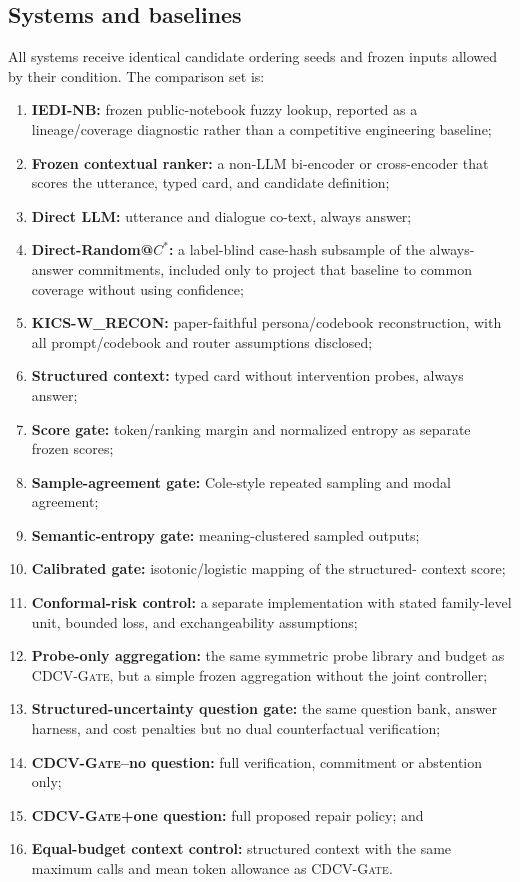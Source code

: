 \documentclass[preprint,12pt,authoryear]{elsarticle}
\newcommand{\cdcv}{\textsc{CDCV-Gate}}
\begin{document}
\subsection{Systems and baselines}

All systems receive identical candidate ordering seeds and frozen inputs
allowed by their condition. The comparison set is:

\begin{enumerate}[leftmargin=*]
\item \textbf{IEDI-NB:} frozen public-notebook fuzzy lookup, reported as a
lineage/coverage diagnostic rather than a competitive engineering baseline;
\item \textbf{Frozen contextual ranker:} a non-LLM bi-encoder or cross-encoder
that scores the utterance, typed card, and candidate definition;
\item \textbf{Direct LLM:} utterance and dialogue co-text, always answer;
\item \textbf{Direct-Random@$C^*$:} a label-blind case-hash subsample of the
always-answer commitments, included only to project that baseline to common
coverage without using confidence;
\item \textbf{KICS-W\_RECON:} paper-faithful persona/codebook reconstruction,
with all prompt/codebook and router assumptions disclosed;
\item \textbf{Structured context:} typed card without intervention probes,
always answer;
\item \textbf{Score gate:} token/ranking margin and normalized entropy as
separate frozen scores;
\item \textbf{Sample-agreement gate:} Cole-style repeated sampling and modal
agreement;
\item \textbf{Semantic-entropy gate:} meaning-clustered sampled outputs;
\item \textbf{Calibrated gate:} isotonic/logistic mapping of the structured-
context score;
\item \textbf{Conformal-risk control:} a separate implementation with stated
family-level unit, bounded loss, and exchangeability assumptions;
\item \textbf{Probe-only aggregation:} the same symmetric probe library and
budget as \cdcv, but a simple frozen aggregation without the joint controller;
\item \textbf{Structured-uncertainty question gate:} the same question bank,
answer harness, and cost penalties but no dual counterfactual verification;
\item \textbf{\cdcv{}--no question:} full verification, commitment or
abstention only;
\item \textbf{\cdcv{}+one question:} full proposed repair policy; and
\item \textbf{Equal-budget context control:} structured context with the same
maximum calls and mean token allowance as \cdcv.
\end{enumerate}
\end{document}

